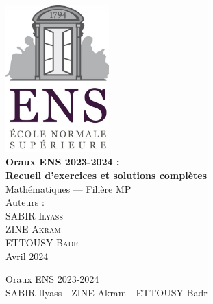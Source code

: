 \documentclass[a4paper,11pt]{article}
\newcounter{exercice}
\begin{document}

\begin{center}
    \vspace*{0.1cm}
    \includegraphics[width=0.3\textwidth]{figures/ENS_Logo_TL.jpg}\\[1cm]

    {\LARGE \textbf{Oraux ENS 2023-2024 :}}\\[1cm]
    {\LARGE \textbf{Recueil d'exercices et solutions complètes}}\\[1cm]

    {\Large Mathématiques — Filière MP}\\[2cm]

    {\Large Auteurs :}\\[0.5cm]
    {\large \textsc{SABIR Ilyass}}\\[0.3cm]
    {\large \textsc{ZINE Akram}}\\[0.3cm]
    {\large \textsc{ETTOUSY Badr}}\\[2cm]

    {\Large Avril 2024}
\end{center}
\newpage
\begin{center}
Oraux ENS 2023-2024 \\ 
SABIR Ilyass - ZINE Akram - ETTOUSY Badr
\end{center}

\newpage


\newpage


\newpage
\tableofcontents
\thispagestyle{empty}
\clearpage

\pagestyle{fancy}
\setcounter{page}{1}

\fancyhf{}  %
\fancyhead[R]{\thepage}              %
\renewcommand{\headrulewidth}{0.4pt} %
\end{document}
